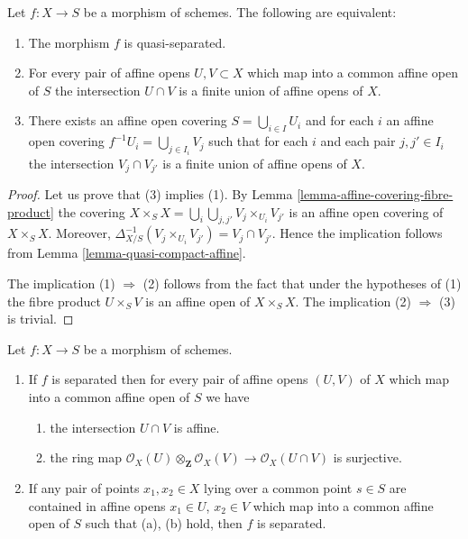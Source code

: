\begin{lemma}
\label{lemma-characterize-quasi-separated}
Let $f : X \to S$ be a morphism of schemes.
The following are equivalent:
\begin{enumerate}
\item The morphism $f$ is quasi-separated.
\item For every pair of affine opens $U, V \subset X$
which map into a common affine open of $S$ the intersection
$U \cap V$ is a finite union of affine opens of $X$.
\item There exists an affine open covering $S = \bigcup_{i \in I} U_i$
and for each $i$ an affine open covering $f^{-1}U_i = \bigcup_{j \in I_i} V_j$
such that for each $i$ and each pair $j, j' \in I_i$ the
intersection $V_j \cap V_{j'}$ is a finite union of affine
opens of $X$.
\end{enumerate}
\end{lemma}

\begin{proof}
Let us prove that (3) implies (1).
By Lemma \ref{lemma-affine-covering-fibre-product}
the covering $X \times_S X = \bigcup_i \bigcup_{j,j'} V_j \times_{U_i} V_{j'}$
is an affine open covering of $X\times_S X$.
Moreover, $\Delta_{X/S}^{-1}(V_j \times_{U_i} V_{j'}) = V_j \cap V_{j'}$.
Hence the implication follows from Lemma \ref{lemma-quasi-compact-affine}.

\medskip\noindent
The implication (1) $\Rightarrow$ (2) follows from the fact
that under the hypotheses of (1) the fibre product
$U \times_S V$ is an affine open of $X \times_S X$.
The implication (2) $\Rightarrow$ (3) is trivial.
\end{proof}

\begin{lemma}
\label{lemma-characterize-separated}
Let $f : X \to S$ be a morphism of schemes.
\begin{enumerate}
\item If $f$ is separated then for every pair of affine
opens $(U, V)$ of $X$ which map into a
common affine open of $S$ we have
\begin{enumerate}
\item the intersection $U \cap V$ is affine.
\item the ring map
$\mathcal{O}_X(U) \otimes_{\mathbf{Z}} \mathcal{O}_X(V)
\to \mathcal{O}_X(U \cap V)$
is surjective.
\end{enumerate}
\item If any pair of points $x_1, x_2 \in X$ lying over a common
point $s \in S$ are contained in affine opens $x_1 \in U$,
$x_2 \in V$ which map into a common affine open of $S$ such
that (a), (b) hold, then $f$ is separated.
\end{enumerate}
\end{lemma}

